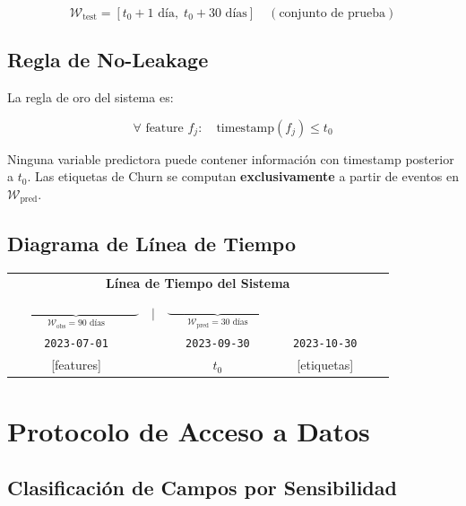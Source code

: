 \documentclass[12pt,a4paper]{article}
\begin{document}
\begin{equation}
\mathcal{W}_{\text{test}} = [t_0 + 1\text{ día},\; t_0 + 30\text{ días}] \quad (\text{conjunto de prueba})
\end{equation}

\subsection{Regla de No-Leakage}

La regla de oro del sistema es:

\begin{equation}
\boxed{\forall \text{ feature } f_j: \quad \text{timestamp}(f_j) \leq t_0}
\end{equation}

Ninguna variable predictora puede contener información con timestamp posterior a $t_0$. Las etiquetas de Churn se computan \textbf{exclusivamente} a partir de eventos en $\mathcal{W}_{\text{pred}}$.

\subsection{Diagrama de Línea de Tiempo}

\begin{center}
\begin{tabular}{ccccccc}
\multicolumn{7}{c}{\textbf{Línea de Tiempo del Sistema}} \\[0.5em]
$\underbrace{\qquad\qquad\qquad\qquad\qquad}_{\mathcal{W}_{\text{obs}} = 90 \text{ días}}$ &
$\Big|$ &
$\underbrace{\qquad\qquad\qquad\qquad}_{\mathcal{W}_{\text{pred}} = 30 \text{ días}}$ & \\
\texttt{2023-07-01} & & \texttt{2023-09-30} & & \texttt{2023-10-30} \\
{[features]} & & $t_0$ & & {[etiquetas]} \\
\end{tabular}
\end{center}

\newpage

\section{Protocolo de Acceso a Datos}

\subsection{Clasificación de Campos por Sensibilidad}
\end{document}
